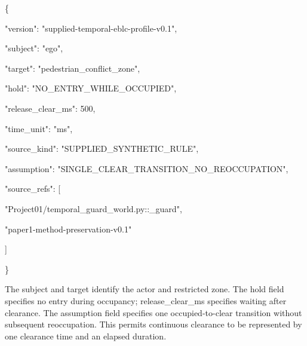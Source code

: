 \documentclass[11pt,a4paper]{article}
\begin{document}
\begingroup\small\ttfamily\setlength{\parskip}{1pt}
\noindent\hspace*{0.0em}\{\par
\noindent\hspace*{1.0em}"version": "supplied-temporal-eblc-profile-v0.1",\par
\noindent\hspace*{1.0em}"subject": "ego",\par
\noindent\hspace*{1.0em}"target": "pedestrian\_\allowbreak{}conflict\_\allowbreak{}zone",\par
\noindent\hspace*{1.0em}"hold": "NO\_\allowbreak{}ENTRY\_\allowbreak{}WHILE\_\allowbreak{}OCCUPIED",\par
\noindent\hspace*{1.0em}"release\_\allowbreak{}clear\_\allowbreak{}ms": 500,\par
\noindent\hspace*{1.0em}"time\_\allowbreak{}unit": "ms",\par
\noindent\hspace*{1.0em}"source\_\allowbreak{}kind": "SUPPLIED\_\allowbreak{}SYNTHETIC\_\allowbreak{}RULE",\par
\noindent\hspace*{1.0em}"assumption": "SINGLE\_\allowbreak{}CLEAR\_\allowbreak{}TRANSITION\_\allowbreak{}NO\_\allowbreak{}REOCCUPATION",\par
\noindent\hspace*{1.0em}"source\_\allowbreak{}refs": [\par
\noindent\hspace*{2.0em}"Project01/temporal\_\allowbreak{}guard\_\allowbreak{}world.py::\_\allowbreak{}guard",\par
\noindent\hspace*{2.0em}"paper1-method-preservation-v0.1"\par
\noindent\hspace*{1.0em}]\par
\noindent\hspace*{0.0em}\}\par\endgroup\par

The {\ttfamily\small subject} and {\ttfamily\small target} identify the actor and restricted zone. The {\ttfamily\small hold} field specifies no entry during occupancy; {\ttfamily\small release\_\allowbreak{}clear\_\allowbreak{}ms} specifies waiting after clearance. The {\ttfamily\small assumption} field specifies one occupied-to-clear transition without subsequent reoccupation. This permits continuous clearance to be represented by one clearance time and an elapsed duration.\par
\end{document}

